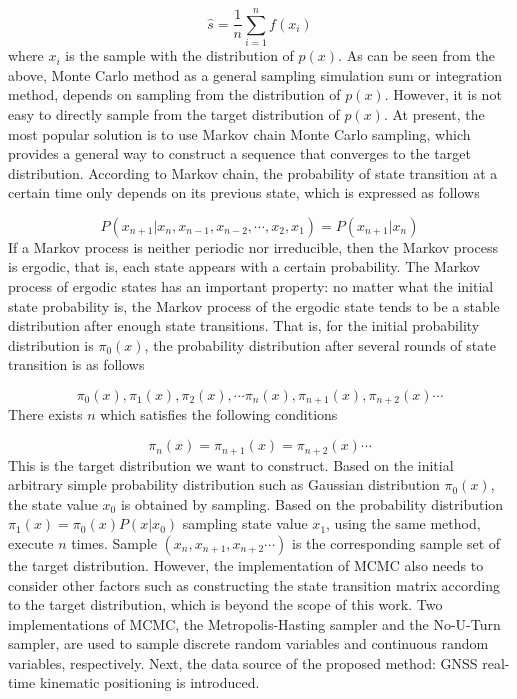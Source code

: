 \documentclass{svjour3}                     %
\begin{document}
\begin{equation}\label{eq_monte_carlo_3}
\hat s = \frac{1}{n}\sum\limits_{i = 1}^n {f({x_i})}
\end{equation}
where $x_i$ is the sample with the distribution of $p(x)$. As can be seen from the above, Monte Carlo method as a general sampling simulation sum or integration method, depends on sampling from the distribution of $p(x)$. However, it is not easy to directly sample from the target distribution of $p(x)$. At present, the most popular solution is to use Markov chain Monte Carlo sampling, which provides a general way to construct a sequence that converges to the target distribution. According to Markov chain, the probability of state transition at a certain time only depends on its previous state, which is expressed as follows

\begin{equation}\label{eq_markov_chain_1}
P({x_{n + 1}}\left| {{x_n},{x_{n - 1}}} \right.,{x_{n - 2}}, \cdots ,{x_2},{x_1}) = P({x_{n + 1}}\left| {{x_n}} \right.)
\end{equation}
If a Markov process is neither periodic nor irreducible, then the Markov process is ergodic, that is, each state appears with a certain probability. The Markov process of ergodic states has an important property: no matter what the initial state probability is, the Markov process of the ergodic state tends to be a stable distribution after enough state transitions.
That is, for the initial probability distribution is $\pi_0(x)$, the probability distribution after several rounds of state transition is as follows

\begin{equation}\label{eq_markov_chain_2}
\pi_{0}(x),\pi_{1}(x),\pi_{2}(x),\cdots \pi_{n}(x),\pi_{n+1}(x),\pi_{n+2}(x)\cdots
\end{equation}
There exists $n$ which satisfies the following conditions

\begin{equation}\label{eq_markov_chain_3}
\pi_{n}(x)=\pi_{n+1}(x)=\pi_{n+2}(x)\cdots
\end{equation}
This is the target distribution we want to construct. Based on the initial arbitrary simple probability distribution such as Gaussian distribution $\pi_{0}(x)$, the state value $x_0$ is obtained by sampling. Based on the probability distribution $\pi_{1}(x)=\pi_{0}(x)P(x\left| {{x_0}} \right.)$ sampling state value $x_1$, using the same method, execute $n$ times. Sample $(x_{n},x_{n+1},x_{n+2}\cdots)$ is the corresponding sample set of the target distribution. However, the implementation of MCMC also needs to consider other factors such as constructing the state transition matrix according to the target distribution, which is beyond the scope of this work. Two implementations of MCMC,  the Metropolis-Hasting sampler\citep{chib1995understanding} and the No-U-Turn sampler\citep{hoffman2014no}, are used to sample discrete random variables and continuous random variables, respectively. Next, the data source of the proposed method: GNSS real-time kinematic positioning is introduced.
\end{document}
